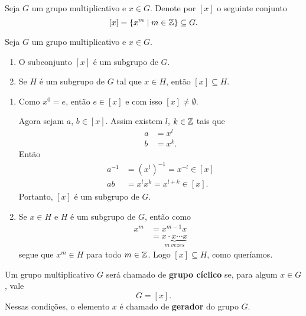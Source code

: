 \begin{definicao}
    Seja $G$ um grupo multiplicativo e $x \in G$. Denote por $[x]$ o seguinte conjunto
    \[
        [x] = \{x^m \mid m \in \mathbb{Z}\} \subseteq G.
    \]
\end{definicao}

\begin{proposicao}
    Seja $G$ um grupo multiplicativo e $x \in G$.
    \begin{enumerate}[label={\roman*})]
        \item O subconjunto $[x]$ é um subgrupo de $G$.

        \item Se $H$ é um subgrupo de $G$ tal que $x \in H$, então $[x] \subseteq H$.
    \end{enumerate}
\end{proposicao}
\begin{prova}
    \begin{enumerate}[label={\roman*})]
        \item Como $x^0 = e$, então $e \in [x]$ e com isso $[x] \ne \emptyset$.

        Agora sejam $a$, $b \in [x]$. Assim existem $l$, $k \in \mathbb{Z}$ tais que
        \begin{align*}
            a &= x^l\\
            b &= x^k.
        \end{align*}
        Então
        \begin{align*}
            a^{-1} &= (x^l)^{-1} = x^{-l} \in [x]\\
            ab &= x^lx^k = x^{l + k} \in [x].
        \end{align*}
        Portanto, $[x]$ é um subgrupo de $G$.

        \item Se $x \in H$ e $H$ é um subgrupo de $G$, então como
        \begin{align*}
            x^m &=  x^{m-1}x\\
            &=\underbrace{x\cdot x \cdots x}_{m\ vezes}
        \end{align*}
        segue que $x^m \in H$ para todo $m \in \mathbb{Z}$. Logo $[x] \subseteq H$, como queríamos.
    \end{enumerate}
\end{prova}

\begin{definicao}
    Um grupo multiplicativo $G$ será chamado de \textbf{grupo cíclico} se, para algum $x \in G$, vale
    \[
        G = [x].
    \]
    Nessas condições, o elemento $x$  é chamado de \textbf{gerador} do grupo $G$.
\end{definicao}

